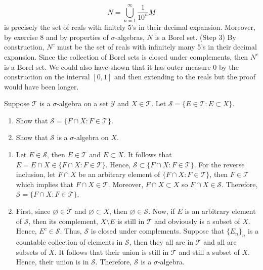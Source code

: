\begin{solution}
    $$N = \bigcup_{n=1}^{\infty}\frac{1}{10^n}M$$ 
    is precisely the set of reals with finitely 5's in their decimal expansion. Moreover, by exercise 8 and by properties of $\sigma$-algebras, $N$ is a Borel set. \bigbreak
    \noindent (Step 3) By construction, $N^c$ must be the set of reals with infinitely many 5's in their decimal expansion. Since the collection of Borel sets is closed under complements, then $N^c$ is a Borel set. We could also have shown that it has outer measure 0 by the construction on the interval $[0,1]$ and then extending to the reals but the proof would have been longer. \\
\end{solution}

\begin{exercise}
    Suppose $\mathcal{T}$ is a $\sigma$-algebra on a set $\mathcal{Y}$ and $X \in \mathcal{T}$. Let $\mathcal{S} = \{E \in \mathcal{T} : E\subset X\}$.
    \begin{enumerate}[label = (\alph*)]
        \item Show that $\mathcal{S} = \{F \cap X : F \in \mathcal{T}\}$.
        \item Show that $\mathcal{S}$ is a $\sigma$-algebra on $X$.\\
    \end{enumerate}
\end{exercise}

\begin{solution}
    \begin{enumerate}[label = (\alph*)]
        \item Let $E \in \mathcal{S}$, then $E \in \mathcal{T}$ and $E \subset X$. It follows that $E = E \cap X \in \{F \cap X : F \in \mathcal{T}\}$. Hence, $\mathcal{S} \subset \{F \cap X : F \in \mathcal{T}\}$. For the reverse inclusion, let $F \cap X$ be an arbitrary element of $\{F \cap X : F \in \mathcal{T}\}$, then $F \in \mathcal{T}$ which implies that $F \cap X \in \mathcal{T}$. Moreover, $F \cap X \subset X$ so $F \cap X \in \mathcal{S}$. Therefore, $\mathcal{S} = \{F \cap X : F \in \mathcal{T}\}$.
        \item First, since $\varnothing \in \mathcal{T}$ and $\varnothing \subset X$, then $\varnothing \in \mathcal{S}$. Now, if $E$ is an arbitrary element of $\mathcal{S}$, then its complement, $X \setminus E$ is still in $\mathcal{T}$ and obviously is a subset of $X$. Hence, $E^c \in \mathcal{S}$. Thus, $\mathcal{S}$ is closed under complements. Suppose that $\{E_n\}_n$ is a countable collection of elements in $\mathcal{S}$, then they all are in $\mathcal{T}$ and all are subsets of $X$. It follows that their union is still in $\mathcal{T}$ and still a subset of $X$. Hence, their union is in $\mathcal{S}$. Therefore, $\mathcal{S}$ is a $\sigma$-algebra. \\
    \end{enumerate}
\end{solution}

